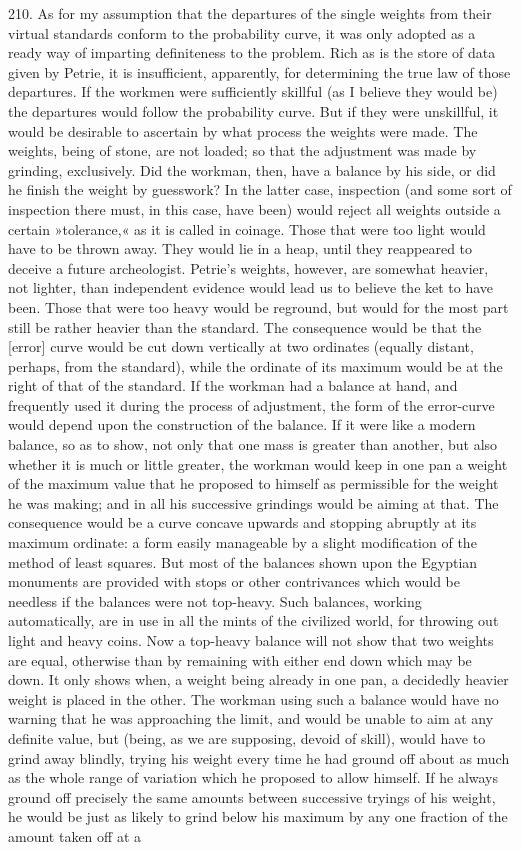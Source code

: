 210. As for my assumption that the departures of the single weights from their virtual standards conform to the probability curve, it was only adopted as a ready way of imparting definiteness to the problem. Rich as is the store of data given by Petrie, it is insufficient, apparently, for determining the true law of those departures. If the workmen were sufficiently skillful (as I believe they would be) the departures would follow the probability curve. But if they were unskillful, it would be desirable to ascertain by what process the weights were made. The weights, being of stone, are not loaded; so that the adjustment was made by grinding, exclusively. Did the workman, then, have a balance by his side, or did he finish the weight by guesswork? In the latter case, inspection (and some sort of inspection there must, in this case, have been) would reject all weights outside a certain »tolerance,« as it is called in coinage. Those that were too light would have to be thrown away. They would lie in a heap, until they reappeared to deceive a future archeologist. Petrie's weights, however, are somewhat heavier, not lighter, than independent evidence would lead us to believe the ket to have been. Those that were too heavy would be reground, but would for the most part still be rather heavier than the standard. The consequence would be that the [error] curve would be cut down vertically at two ordinates (equally distant, perhaps, from the standard), while the ordinate of its maximum would be at the right of that of the standard. If the workman had a balance at hand, and frequently used it during the process of adjustment, the form of the error-curve would depend upon the construction of the balance. If it were like a modern balance, so as to show, not only that one mass is greater than another, but also whether it is much or little greater, the workman would keep in one pan a weight of the maximum value that he proposed to himself as permissible for the weight he was making; and in all his successive grindings would be aiming at that. The consequence would be a curve  concave upwards and stopping abruptly at its maximum ordinate: a form easily manageable by a slight modification of the method of least squares. But most of the balances shown upon the Egyptian monuments are provided with stops or other contrivances which would be needless if the balances were not top-heavy. Such balances, working automatically, are in use in all the mints of the civilized world, for throwing out light and heavy coins. Now a top-heavy balance will not show that two weights are equal, otherwise than by remaining with either end down which may be down. It only shows when, a weight being already in one pan, a decidedly heavier weight is placed in the other. The workman using such a balance would have no warning that he was approaching the limit, and would be unable to aim at any definite value, but (being, as we are supposing, devoid of skill), would have to grind away blindly, trying his weight every time he had ground off about as much as the whole range of variation which he proposed to allow himself. If he always ground off precisely the same amounts between successive tryings of his weight, he would be just as likely to grind below his maximum by any one fraction of the amount taken off at a 